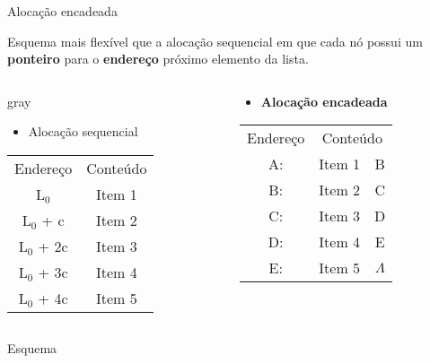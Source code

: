 \begin{frame}{Alocação encadeada}

Esquema mais flexível que a alocação sequencial em que cada nó possui
um {\bf ponteiro} para o {\bf endereço} próximo elemento da lista.

\bigskip

\begin{columns}
\begin{column}{.5\textwidth}
\begin{color}{gray}
\begin{itemize}
\item  Alocação sequencial
\end{itemize}
\begin{tabular}{c|c|}\cline{2-2}
Endereço & Conteúdo  \\\cline{2-2}
L$_0$ & Item 1  \\\cline{2-2}
L$_0$ + c & Item 2 \\\cline{2-2}
L$_0$ + 2c & Item 3  \\\cline{2-2}
L$_0$ + 3c & Item 4  \\\cline{2-2}
L$_0$ + 4c & Item 5 \\\cline{2-2}
\end{tabular}
\end{color}
\end{column}

\begin{column}{.5\textwidth}
\begin{itemize}
\item {\bf Alocação encadeada}
\end{itemize}
\begin{tabular}{c|c|c|}\cline{2-3}
Endereço & \multicolumn{2}{c|}{Conteúdo}   \\\cline{2-3}
A: & Item 1 & B \\\cline{2-3}
B: & Item 2 & C \\\cline{2-3}
C: & Item 3 & D \\\cline{2-3}
D: & Item 4 & E \\\cline{2-3}
E: & Item 5 & $\Lambda$ \\\cline{2-3}
\end{tabular}
\end{column}
\end{columns}

Esquema


\end{frame}

